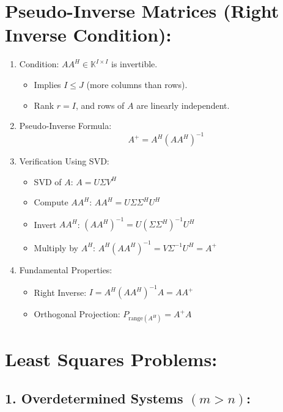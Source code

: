 \documentclass{article}
\begin{document}
\section*{Pseudo-Inverse Matrices (Right Inverse Condition):}

\begin{enumerate}
    \item Condition: $AA^H \in \mathbb{K}^{I \times I}$ is invertible.
    \begin{itemize}
        \item Implies $I \leq J$ (more columns than rows).
        \item Rank $r = I$, and rows of $A$ are linearly independent.
    \end{itemize}
    
    \item Pseudo-Inverse Formula:
    \[
    A^+ = A^H(AA^H)^{-1}
    \]

    \item Verification Using SVD:
    \begin{itemize}
        \item SVD of $A$: $A = U \Sigma V^H$
        \item Compute $AA^H$: $AA^H = U \Sigma \Sigma^H U^H$
        \item Invert $AA^H$: $(AA^H)^{-1} = U(\Sigma \Sigma^H)^{-1}U^H$
        \item Multiply by $A^H$: $A^H(AA^H)^{-1} = V \Sigma^{-1} U^H = A^+$
    \end{itemize}
    
    \item Fundamental Properties:
    \begin{itemize}
        \item Right Inverse: $I = A^H(AA^H)^{-1} A = AA^+$
        \item Orthogonal Projection: $P_{\text{range}(A^H)} = A^+ A$
    \end{itemize}
\end{enumerate}


\section*{Least Squares Problems:}

\subsection*{1. Overdetermined Systems $(m > n)$:}
\end{document}
